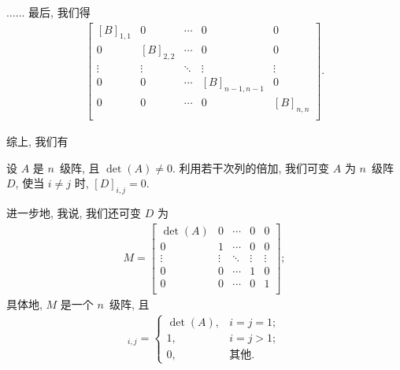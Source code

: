 \(\dots \dots\)
最后, 我们得
\begin{align*}
    \begin{bmatrix}
        [B]_{1,1} & 0         & \cdots & 0             & 0         \\
        0         & [B]_{2,2} & \cdots & 0             & 0         \\
        \vdots    & \vdots    & \ddots & \vdots        & \vdots    \\
        0         & 0         & \cdots & [B]_{n-1,n-1} & 0         \\
        0         & 0         & \cdots & 0             & [B]_{n,n} \\
    \end{bmatrix}.
\end{align*}

综上, 我们有

\begin{theorem}
    设 \(A\) 是 \(n\)~级阵,
    且 \(\det {(A)} \neq 0\).
    利用若干次列的倍加,
    我们可变 \(A\) 为 \(n\)~级阵 \(D\),
    使当 \(i \neq j\) 时,
    \([D]_{i,j} = 0\).
\end{theorem}

进一步地, 我说, 我们还可变 \(D\) 为
\begin{align*}
    M =
    \begin{bmatrix}
        \det {(A)} & 0      & \cdots & 0      & 0      \\
        0          & 1      & \cdots & 0      & 0      \\
        \vdots     & \vdots & \ddots & \vdots & \vdots \\
        0          & 0      & \cdots & 1      & 0      \\
        0          & 0      & \cdots & 0      & 1      \\
    \end{bmatrix};
\end{align*}
具体地, \(M\) 是一个 \(n\)~级阵,
且
\begin{align*}
    [M]_{i,j} =
    \begin{cases}
        \det {(A)}, & i = j = 1; \\
        1,          & i = j > 1; \\
        0,          & \text{其他}.
    \end{cases}
\end{align*}

